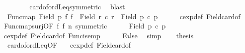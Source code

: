 \begin{isabellebody}
\ \ \ \ \isamarkupfalse%
\ {}\ \isamarkupfalse%
\ card{\isacharunderscore}{\kern0pt}of{\isacharunderscore}{\kern0pt}ordLeq{\isacharbrackleft}{\kern0pt}symmetric{\isacharbrackright}{\kern0pt}\ \isamarkupfalse%
\ blast\isanewline
\ \ \isamarkupfalse%
\ {}{\isacharcolon}{\kern0pt}\ {\isachardoublequoteopen}Func{\isacharunderscore}{\kern0pt}map\ {\isacharparenleft}{\kern0pt}Field\ p{}{\isacharparenright}{\kern0pt}\ f{}\ f{}\ {\isacharbackquote}{\kern0pt}\ {\isacharparenleft}{\kern0pt}Field\ {\isacharparenleft}{\kern0pt}r{}\ {\isacharcircum}{\kern0pt}c\ r{}{\isacharparenright}{\kern0pt}{\isacharparenright}{\kern0pt}\ {\isacharequal}{\kern0pt}\ Field\ {\isacharparenleft}{\kern0pt}p{}\ {\isacharcircum}{\kern0pt}c\ p{}{\isacharparenright}{\kern0pt}{\isachardoublequoteclose}\isanewline
\ \ \ \ \isamarkupfalse%
\ cexp{\isacharunderscore}{\kern0pt}def\ Field{\isacharunderscore}{\kern0pt}card{\isacharunderscore}{\kern0pt}of\ \isamarkupfalse%
\ Func{\isacharunderscore}{\kern0pt}map{\isacharunderscore}{\kern0pt}surj{\isacharbrackleft}{\kern0pt}OF\ f{}\ f{}\ n{\isacharcomma}{\kern0pt}\ symmetric{\isacharbrackright}{\kern0pt}\ \isacommand{{\isachardot}{\kern0pt}}\isamarkupfalse%
\isanewline
\ \ \isamarkupfalse%
\ {}{}{\isacharcolon}{\kern0pt}\ {\isachardoublequoteopen}Field\ {\isacharparenleft}{\kern0pt}p{}\ {\isacharcircum}{\kern0pt}c\ p{}{\isacharparenright}{\kern0pt}\ {\isasymnoteq}\ {\isacharbraceleft}{\kern0pt}{\isacharbraceright}{\kern0pt}{\isachardoublequoteclose}\ \isamarkupfalse%
\ cexp{\isacharunderscore}{\kern0pt}def\ Field{\isacharunderscore}{\kern0pt}card{\isacharunderscore}{\kern0pt}of\ Func{\isacharunderscore}{\kern0pt}is{\isacharunderscore}{\kern0pt}emp\isanewline
\ \ \ \ \isamarkupfalse%
\ False\ \isamarkupfalse%
\ simp\isanewline
\ \ \isamarkupfalse%
\ {\isacharquery}{\kern0pt}thesis\isanewline
\ \ \ \ \isamarkupfalse%
\ {}\ card{\isacharunderscore}{\kern0pt}of{\isacharunderscore}{\kern0pt}ordLeq{}{\isacharbrackleft}{\kern0pt}OF\ {}{}{\isacharbrackright}{\kern0pt}\ \isamarkupfalse%
\ cexp{\isacharunderscore}{\kern0pt}def\ Field{\isacharunderscore}{\kern0pt}card{\isacharunderscore}{\kern0pt}of\ \isamarkupfalse%

\end{isabellebody}
